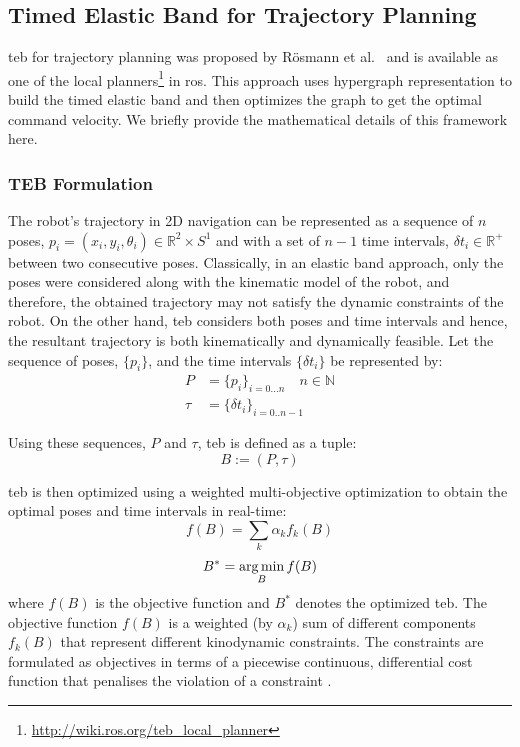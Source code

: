 \subsection{Timed Elastic Band for Trajectory Planning}
\acrfull{teb} for trajectory planning was proposed by R{\"o}smann et al.~\cite{rosmann2013efficient} and is available as one of the local planners\footnote{\url{http://wiki.ros.org/teb_local_planner}} in \acrshort{ros}. This approach uses hypergraph representation to build the timed elastic band and then optimizes the graph to get the optimal command velocity. We briefly provide the mathematical details of this framework here.

\subsubsection{TEB Formulation}
The robot's trajectory in 2D navigation can be represented as a sequence of $n$ poses, $p_i = (x_i, y_i, \theta_i) \in \mathbb{R}^2 \times S^1$  and with a set of $n-1$ time intervals, $\delta t_i \in \mathbb{R}^+$ between two consecutive poses. Classically, in an elastic band \cite{quinlan1993elastic} approach, only the poses were considered along with the kinematic model of the robot, and therefore, the obtained trajectory may not satisfy the dynamic constraints of the robot. On the other hand, \acrshort{teb} considers both poses and time intervals and hence, the resultant trajectory is both kinematically and dynamically feasible. Let the sequence of poses, $\{p_i\}$, and the time intervals $\{\delta t_i\}$ be represented by:
\begin{equation*}
    \begin{aligned}
      P & = \{p_i\}_{i=0...n} \quad n \in \mathbb{N} \\
      \tau & = \{\delta t_i\}_{i=0..n-1} 
    \end{aligned}
\end{equation*}

Using these sequences, $P$ and $\tau$, \acrshort{teb} is defined as a tuple:
\begin{equation}
    B := (P,\tau)
\end{equation}

\acrshort{teb} is then optimized using a weighted multi-objective optimization to obtain the optimal poses and time intervals in real-time:
\begin{equation}
    f(B) = \sum_k \alpha_kf_k(B)
\end{equation}
\begin{equation}
    B^* = \argmin_B f(B)
\end{equation}
where $f(B)$ is the objective function and $B^*$ denotes the optimized \acrshort{teb}. The objective function $f(B)$ is a weighted (by $\alpha_k$) sum of different components $f_k(B)$ that represent different kinodynamic constraints. The constraints are formulated as objectives in terms of a piecewise continuous, differential cost function that penalises the violation of a constraint \cite{rosmann2013efficient}.

